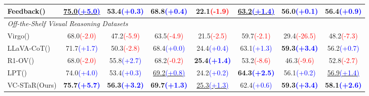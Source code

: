 \begin{tabular}{lccccccc}
Feedback(\citeyear{qu2024recursive})& \cellcolor{light-blue}\underline{75.0\textcolor{blue}{\tiny(+5.0)}} & 53.4\textcolor{blue}{\tiny(+0.3)} & 68.8\textcolor{blue}{\tiny(+0.4)} & 22.1\textcolor{red}{\tiny(-1.9)} & \cellcolor{light-blue}\underline{63.2\textcolor{blue}{\tiny(+1.4)}} & 56.0\textcolor{blue}{\tiny(+0.1)} & 56.4\textcolor{blue}{\tiny(+0.9)}\\
\midrule
\multicolumn{7}{l}{\textit{Off-the-Shelf Visual Reasoning Datasets}} \\ \addlinespace[1pt]
\midrule
Virgo(\citeyear{du2025virgopreliminaryexplorationreproducing})& 68.0\textcolor{red}{\tiny(-2.0)} & 47.2\textcolor{red}{\tiny(-5.9)} & 63.5\textcolor{red}{\tiny(-4.9)} & 21.5\textcolor{red}{\tiny(-2.5)} & 59.7\textcolor{red} {\tiny(-2.1)} & 29.4\textcolor{red}{\tiny(-26.5)} & 48.2\textcolor{red}{\tiny(-7.3)}\\ \addlinespace[5pt]
LLaVA-CoT(\citeyear{xu2024llava})& 71.7\textcolor{blue}{\tiny(+1.7)} & 50.3\textcolor{red}{\tiny(-2.8)} & 68.4\textcolor{blue}{\tiny(+0.0)} & 24.4\textcolor{blue}{\tiny(+0.4)} & 63.1\textcolor{blue}{\tiny(+1.3)} & \cellcolor{light-green}\textbf{59.3\textcolor{blue}{\tiny(+3.4)}} & 56.2\textcolor{blue}{\tiny(+0.7)}\\ \addlinespace[5pt]
R1-OV(\citeyear{yang2025r1onevisionadvancinggeneralizedmultimodal})& 68.0\textcolor{red}{\tiny(-2.0)} & 55.8\textcolor{blue}{\tiny(+2.7)} & 68.2\textcolor{red}{\tiny(-0.2)} & \cellcolor{light-green}\textbf{25.4\textcolor{blue}{\tiny(+1.4)}} & 53.2\textcolor{red}{\tiny(-8.6)} & 46.3\textcolor{red}{\tiny(-9.6)} & 52.8\textcolor{red}{\tiny(-2.7)}\\ \addlinespace[5pt]
LPT(\citeyear{liao2025longperceptualthoughts})& 74.0\textcolor{blue}{\tiny(+4.0)} & 53.4\textcolor{blue}{\tiny(+0.3)} & \cellcolor{light-blue}\underline{69.2\textcolor{blue}{\tiny(+0.8)}} & 24.2\textcolor{blue}{\tiny(+0.2)} & \cellcolor{light-green}\textbf{64.3\textcolor{blue}{\tiny(+2.5)}}  & 56.1\textcolor{blue}{\tiny(+0.2)} & \cellcolor{light-blue}\underline{56.9\textcolor{blue}{\tiny(+1.4)}}\\
\midrule
VC-STaR(Ours)& \cellcolor{light-green}\textbf{75.7\textcolor{blue}{\tiny(+5.7)}} & \cellcolor{light-green}\textbf{56.3\textcolor{blue}{\tiny(+3.2)}} & \cellcolor{light-green}\textbf{69.7\textcolor{blue}{\tiny(+1.3)}} & \cellcolor{light-blue}\underline{25.3\textcolor{blue}{\tiny(+1.3)}} & 62.4\textcolor{blue}{\tiny(+0.6)} &\cellcolor{light-green}\textbf{59.3\textcolor{blue}{\tiny(+3.4)}} & \cellcolor{light-green}\textbf{58.1\textcolor{blue}{\tiny(+2.6)}}\\
\bottomrule
\end{tabular}
  
